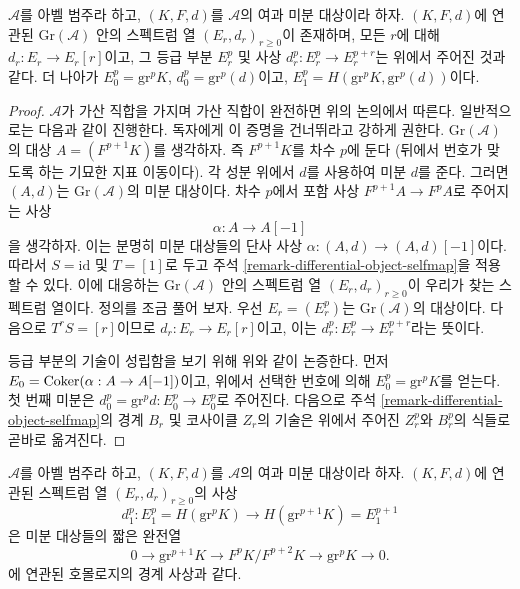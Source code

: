 \begin{lemma}
\label{lemma-spectral-sequence-filtered-differential}
$\mathcal{A}$를 아벨 범주라 하고, $(K, F, d)$를 $\mathcal{A}$의 여과
미분 대상이라 하자. $(K, F, d)$에 연관된
$\text{Gr}(\mathcal{A})$ 안의 스펙트럼 열
$(E_r, d_r)_{r \geq 0}$이 존재하며, 모든 $r$에 대해
$d_r : E_r \to E_r[r]$이고, 그 등급 부분 $E_r^p$ 및 사상
$d_r^p : E_r^p \to E_r^{p + r}$는 위에서 주어진 것과 같다. 더 나아가
$E_0^p = \text{gr}^p K$, $d_0^p = \text{gr}^p(d)$이고,
$E_1^p = H(\text{gr}^pK, \text{gr}^p(d))$이다.
\end{lemma}

\begin{proof}
$\mathcal{A}$가 가산 직합을 가지며 가산 직합이 완전하면 위의 논의에서
따른다. 일반적으로는 다음과 같이 진행한다. 독자에게 이 증명을
건너뛰라고 강하게 권한다. $\text{Gr}(\mathcal{A})$의 대상
$A = (F^{p + 1}K)$를 생각하자. 즉 $F^{p + 1}K$를 차수 $p$에 둔다
(뒤에서 번호가 맞도록 하는 기묘한 지표 이동이다). 각 성분 위에서
$d$를 사용하여 미분 $d$를 준다. 그러면 $(A, d)$는
$\text{Gr}(\mathcal{A})$의 미분 대상이다. 차수 $p$에서 포함 사상
$F^{p + 1}A \to F^pA$로 주어지는 사상
$$
\alpha : A \to A[-1]
$$
을 생각하자. 이는 분명히 미분 대상들의 단사 사상
$\alpha : (A, d) \to (A, d)[-1]$이다. 따라서 $S = \text{id}$ 및
$T = [1]$로 두고 주석 \ref{remark-differential-object-selfmap}을
적용할 수 있다. 이에 대응하는 $\text{Gr}(\mathcal{A})$ 안의 스펙트럼
열 $(E_r, d_r)_{r \geq 0}$이 우리가 찾는 스펙트럼 열이다.
정의를 조금 풀어 보자. 우선 $E_r = (E_r^p)$는
$\text{Gr}(\mathcal{A})$의 대상이다. 다음으로 $T^rS = [r]$이므로
$d_r : E_r \to E_r[r]$이고, 이는
$d_r^p : E_r^p \to E_r^{p + r}$라는 뜻이다.

\medskip\noindent
등급 부분의 기술이 성립함을 보기 위해 위와 같이 논증한다.
먼저 $E_0 = \mathop{\mathrm{Coker}}(\alpha : A \to A[-1])$이고, 위에서 선택한 번호에
의해 $E_0^p = \text{gr}^pK$를 얻는다. 첫 번째 미분은
$d_0^p = \text{gr}^pd : E_0^p \to E_0^p$로 주어진다. 다음으로 주석
\ref{remark-differential-object-selfmap}의 경계 $B_r$ 및 코사이클 $Z_r$의
기술은 위에서 주어진 $Z_r^p$와 $B_r^p$의 식들로 곧바로 옮겨진다.
\end{proof}

\begin{lemma}
\label{lemma-spectral-sequence-filtered-differential-d1}
$\mathcal{A}$를 아벨 범주라 하고, $(K, F, d)$를 $\mathcal{A}$의 여과
미분 대상이라 하자. $(K, F, d)$에 연관된 스펙트럼 열
$(E_r, d_r)_{r \geq 0}$의 사상
$$
d_1^p :
E_1^p = H(\text{gr}^pK)
\longrightarrow
H(\text{gr}^{p + 1}K) = E_1^{p + 1}
$$
은 미분 대상들의 짧은 완전열
$$
0 \to \text{gr}^{p + 1}K \to F^pK/F^{p + 2}K \to \text{gr}^pK \to 0.
$$
에 연관된 호몰로지의 경계 사상과 같다.
\end{lemma}

